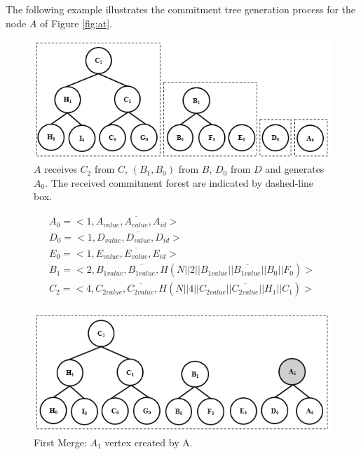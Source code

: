 		The following example illustrates the commitment tree generation process for the node $A$ of Figure \ref{fig:at}.
		\begin{figure}[h!]
			\includegraphics{images/commitment-tree-example-1-shia.png}
			\caption{$A$ receives $C_{2}$ from $C$, $(B_{1},B_{0})$ from $B$, $D_{0}$ from $D$ and generates $A_{0}$. The received commitment forest  are indicated by dashed-line box.}
			\label{fig:commitment-tree-example-1-shia}
		\end{figure}
		\begin{equation*}
			\begin{array}{l}
				A_{0} = <1, A_{value}, \overline{A_{value}}, A_{id}>\\
				D_{0} = <1, D_{value}, \overline{D_{value}}, D_{id}>\\
				E_{0} = <1, E_{value}, \overline{E_{value}}, E_{id}>\\
				B_{1} = <2, B_{1value}, \overline{B_{1value}}, H(N || 2 || B_{1value} || \overline{B_{1value}} || B_{0} || F_{0})>\\
				C_{2} = <4, C_{2value}, \overline{C_{2value}}, H(N || 4 || C_{2value} || \overline{C_{2value}} || H_{1} || C_{1})>\\
			\end{array}
		\end{equation*}
		\begin{figure}[h!]
			\centering
			\includegraphics{images/commitment-tree-example-2-shia.png}
			\caption{First Merge: $A_{1}$ vertex created by A.}
			\label{fig:commitment-tree-example-2-shia}
		\end{figure}
